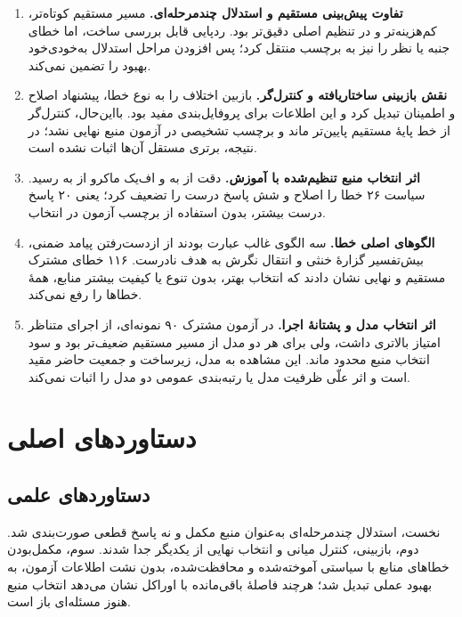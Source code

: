 \begin{enumerate}
    \item \textbf{تفاوت پیش‌بینی مستقیم و استدلال چندمرحله‌ای.} مسیر مستقیم کوتاه‌تر، کم‌هزینه‌تر و در تنظیم اصلی دقیق‌تر بود.  ردپایی قابل بررسی ساخت، اما خطای جنبه یا نظر را نیز به برچسب منتقل کرد؛ پس افزودن مراحل استدلال به‌خودی‌خود بهبود را تضمین نمی‌کند.

    \item \textbf{نقش بازبینی ساختاریافته و کنترل‌گر.} بازبین اختلاف را به نوع خطا، پیشنهاد اصلاح و اطمینان تبدیل کرد و این اطلاعات برای پروفایل‌بندی مفید بود. بااین‌حال، کنترل‌گر از خط پایۀ مستقیم پایین‌تر ماند و برچسب تشخیصی در آزمون منبع نهایی نشد؛ در نتیجه، برتری مستقل آن‌ها اثبات نشده است.

    \item \textbf{اثر انتخاب منبع تنظیم‌شده با آموزش.} دقت از  به  و اف‌یک ماکرو از  به  رسید. سیاست ۲۶ خطا را اصلاح و شش پاسخ درست را تضعیف کرد؛ یعنی ۲۰ پاسخ درست بیشتر، بدون استفاده از برچسب آزمون در انتخاب.

    \item \textbf{الگوهای اصلی خطا.} سه الگوی غالب عبارت بودند از ازدست‌رفتن پیامد ضمنی، بیش‌تفسیر گزارۀ خنثی و انتقال نگرش به هدف نادرست. ۱۱۶ خطای مشترک مستقیم و نهایی نشان دادند که انتخاب بهتر، بدون تنوع یا کیفیت بیشتر منابع، همۀ خطاها را رفع نمی‌کند.

    \item \textbf{اثر انتخاب مدل و پشتانۀ اجرا.} در آزمون مشترک ۹۰ نمونه‌ای،  از اجرای متناظر  امتیاز بالاتری داشت، ولی  برای هر دو مدل از مسیر مستقیم ضعیف‌تر بود و سود انتخاب منبع محدود ماند. این مشاهده به مدل، زیرساخت و جمعیت حاضر مقید است و اثر علّی ظرفیت مدل یا رتبه‌بندی عمومی دو مدل را اثبات نمی‌کند.
\end{enumerate}

\section{دستاوردهای اصلی}

\subsection{دستاوردهای علمی}

نخست، استدلال چندمرحله‌ای به‌عنوان منبع مکمل و نه پاسخ قطعی صورت‌بندی شد. دوم، بازبینی، کنترل میانی و انتخاب نهایی از یکدیگر جدا شدند. سوم، مکمل‌بودن خطاهای منابع با سیاستی آموخته‌شده و محافظت‌شده، بدون نشت اطلاعات آزمون، به بهبود عملی تبدیل شد؛ هرچند فاصلۀ باقی‌مانده با اوراکل نشان می‌دهد انتخاب منبع هنوز مسئله‌ای باز است.

